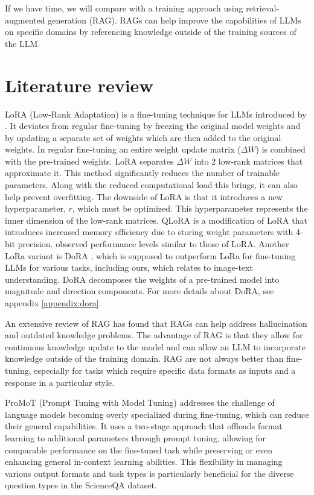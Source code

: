 \documentclass[11pt]{article} %
\begin{document}
If we have time, we will compare with a training approach using retrieval-augmented generation (RAG). RAGs can help improve the capabilities of LLMs on specific domains by referencing knowledge outside of the training sources of the LLM.

\section*{Literature review} 
LoRA (Low-Rank Adaptation) is a fine-tuning technique for LLMs introduced by \cite{lora}. It deviates from regular fine-tuning by freezing the original model weights and by updating a separate set of weights which are then added to the original weights. In regular fine-tuning an entire weight update matrix ($\Delta W$) is combined with the pre-trained weights. LoRA separates $\Delta W$ into 2 low-rank matrices that approximate it. This method significantly reduces the number of trainable parameters. Along with the reduced computational load this brings, it can also help prevent overfitting. The downside of LoRA is that it introduces a new hyperparameter, $r$, which must be optimized. This hyperparameter represents the inner dimension of the low-rank matrices. QLoRA \cite{qlora} is a modification of LoRA that introduces increased memory efficiency due to storing weight parameters with 4-bit precision. \cite{qlora} observed performance levels similar to those of LoRA.
Another LoRa variant is DoRA \cite{dora}, which is supposed to outperform LoRa for fine-tuning LLMs for various tasks, including ours, which relates to image-text understanding. DoRA decomposes the weights of a pre-trained model into magnitude and direction components. For more details about DoRA, see appendix \ref{appendix:dora}.

An extensive review of RAG \cite{ragreview} has found that RAGs can help address hallucination and outdated knowledge problems. The advantage of RAG is that they allow for continuous knowledge update to the model and can allow an LLM to incorporate knowledge outside of the training domain. RAG are not always better than fine-tuning, especially for tasks which require specific data formats as inputs and a response in a particular style.

ProMoT (Prompt Tuning with Model Tuning) \cite{misc} addresses the challenge of language models becoming overly specialized during fine-tuning, which can reduce their general capabilities. It uses a two-stage approach that offloads format learning to additional parameters through prompt tuning, allowing for comparable performance on the fine-tuned task while preserving or even enhancing general in-context learning abilities. This flexibility in managing various output formats and task types is particularly beneficial for the diverse question types in the ScienceQA dataset.
\end{document}
